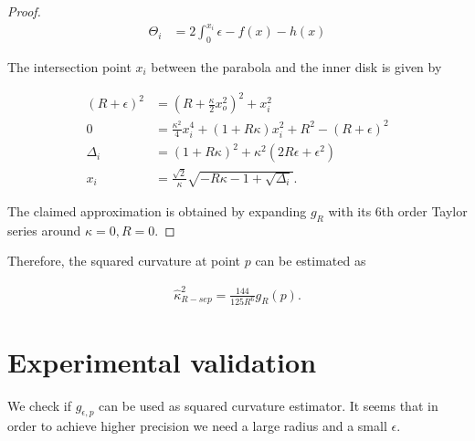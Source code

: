 \begin{proof}
\begin{align*}
	\Theta_i &= 2\int_{0}^{x_i}{\epsilon - f(x) - h(x)}	\end{align*}

The intersection point $x_i$ between the parabola and the inner disk is given by
	
\begin{align*}
	(R+\epsilon)^2 &= (R+\frac{\kappa}{2}x_o^2)^2 + x_i^2\\
	0 &= \frac{\kappa^2}{4}x_i^4 + (1+R\kappa)x_i^2 + R^2 - (R+\epsilon)^2	\\
\Delta_i &= (1+R\kappa)^2 + \kappa^2(2R\epsilon + \epsilon^2)\\
x_i &= \frac{\sqrt{2}}{\kappa}\sqrt{-R\kappa-1+\sqrt{\Delta_i}}.
\end{align*}

The claimed approximation is obtained by expanding $g_R$ with its  6th order Taylor series around $\kappa=0,R=0$.
\end{proof}

Therefore, the squared curvature at point $p$ can be estimated as

\begin{align*}
	\hat{\kappa}_{R-sep} ^2 = \frac{144}{125R^6}g_R(p) .
\end{align*}

\section{Experimental validation}

We check if $g_{\epsilon,p}$ can be used as squared curvature estimator. It seems that in order to achieve higher precision we need a large radius and a small $\epsilon$.

